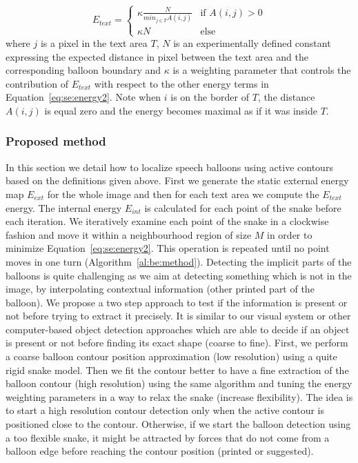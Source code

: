 \begin{equation}\label{eq:se:know}
E_{text} = \begin{cases} \kappa \frac{N}{min_{j \in T} A(i,j)} & \mbox{if } A(i,j) > 0 \\ \kappa N & \mbox{else} \end{cases}
\end{equation}
where $j$ is a pixel in the text area $T$, $N$ is an experimentally defined constant expressing the expected distance in pixel between the text area and the corresponding balloon boundary and $\kappa$ is a weighting parameter that controls the contribution of $E_{text}$ with respect to the other energy terms in Equation~\ref{eq:se:energy2}. Note when $i$ is on the border of $T$, the distance $A(i,j)$ is equal zero and the energy becomes maximal as if it was inside $T$.


\subsubsection{Proposed method}
\label{sec:proposed_method}

In this section we detail how to localize speech balloons using active contours based on the definitions given above. 
First we generate the static external energy map $E_{ext}$ for the whole image and then for each text area we compute the $E_{text}$ energy.
The internal energy $E_{int}$ is calculated for each point of the snake before each iteration.
We iteratively examine each point of the snake in a clockwise fashion and move it within a neighbourhood region of size $M$ in order to minimize Equation~\ref{eq:se:energy2}.
This operation is repeated until no point moves in one turn (Algorithm~\ref{al:be:method}).
Detecting the implicit parts of the balloons is quite challenging as we aim at detecting something which is not in the image, by interpolating contextual information (other printed part of the balloon).
We propose a two step approach to test if the information is present or not before trying to extract it precisely.
It is similar to our visual system or other computer-based object detection approaches which are able to decide if an object is present or not before finding its exact shape (coarse to fine).
First, we perform a coarse balloon contour position approximation (low resolution) using a quite rigid snake model.
Then we fit the contour better to have a fine extraction of the balloon contour (high resolution) using the same algorithm and tuning the energy weighting parameters in a way to relax the snake (increase flexibility).
The idea is to start a high resolution contour detection only when the active contour is positioned close to the contour.
Otherwise, if we start the balloon detection using a too flexible snake, it might be attracted by forces that do not come from a balloon edge before reaching the contour position (printed or suggested).

